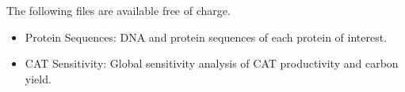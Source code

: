 \documentclass[journal=asbcd6,manuscript=article]{achemso}
\begin{document}
\begin{suppinfo}
The following files are available free of charge.
\begin{itemize}
  \item Protein Sequences: DNA and protein sequences of each protein of interest.
  \item CAT Sensitivity: Global sensitivity analysis of CAT productivity and carbon yield.
\end{itemize}
\end{suppinfo}


\end{document}
